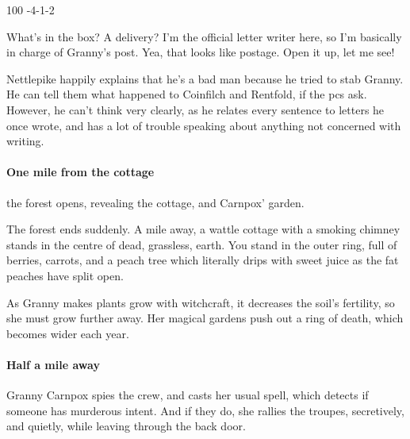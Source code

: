 \documentclass[10pt,twoside]{book}
\begin{document}
%
  {{1}{0}{0}}%
  {{-4}{-1}{-2}}%
  {%
  }%
  {}%
  {}%
  {}%

\begin{speechtext}
  What's in the box?
  A delivery?
  I'm the official letter writer here, so I'm basically in charge of Granny's post.
  Yea, that looks like postage.
  Open it up, let me see!
\end{speechtext}

Nettlepike happily explains that he's a bad man because he tried to stab Granny.
He can tell them what happened to Coinfilch and Rentfold, if the \glspl{pc} ask.
However, he can't think very clearly, as he relates every sentence to letters he once wrote, and has a lot of trouble speaking about anything not concerned with writing.

\paragraph{One mile from the cottage}
the forest opens, revealing the cottage, and Carnpox' garden.

\begin{boxtext}
  The forest ends suddenly.
  A mile away, a wattle cottage with a smoking chimney stands in the centre of dead, grassless, earth.
  You stand in the outer ring, full of berries, carrots, and a peach tree which literally drips with sweet juice as the fat peaches have split open.
\end{boxtext}

\begin{exampletext}
  As Granny makes plants grow with witchcraft, it decreases the soil's fertility, so she must grow further away.
  Her magical gardens push out a ring of death, which becomes wider each year.
\end{exampletext}

\paragraph{Half a mile away}
Granny Carnpox spies the crew, and casts her usual \gls{spell}, which detects if someone has murderous intent.
And if they do, she rallies the troupes, secretively, and quietly, while leaving through the back door.
\end{document}

